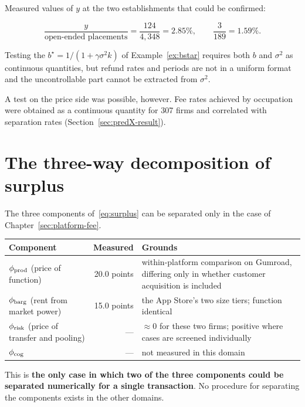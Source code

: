 Measured values of $y$ at the two establishments that could be confirmed:

\[
\frac{y}{\text{open-ended placements}} = \frac{124}{4{,}348} = 2.85\%, \qquad
\frac{3}{189} = 1.59\% .
\]

Testing the $b^\star=1/(1+\gamma\sigma^2 k)$ of Example~\ref{ex:bstar} requires both $b$ and
$\sigma^2$ as continuous quantities, but refund rates and periods are not in a uniform format
and the uncontrollable part cannot be extracted from $\sigma^2$.

A test on the price side was possible, however. Fee rates achieved by occupation were
obtained as a continuous quantity for 307 firms and correlated with separation rates
(Section~\ref{sec:predX-result}).

\section{The three-way decomposition of surplus}

The three components of~\eqref{eq:surplus} can be separated only in the case of
Chapter~\ref{sec:platform-fee}.

\begin{center}
\begin{tabularx}{\textwidth}{@{}lrX@{}}
\toprule
Component & Measured & Grounds \\
\midrule
$\phi_{\rm prod}$ (price of function) & 20.0 points & within-platform comparison on Gumroad, differing only in whether customer acquisition is included \\
$\phi_{\rm barg}$ (rent from market power) & 15.0 points & the App Store's two size tiers; function identical \\
$\phi_{\rm risk}$ (price of transfer and pooling) & --- & $\approx 0$ for these two firms; positive where cases are screened individually \\
$\phi_{\rm cog}$ & --- & not measured in this domain \\
\bottomrule
\end{tabularx}
\label{tab:surplus-decomposition-measured}
\end{center}

This is \textbf{the only case in which two of the three components could be separated
numerically for a single transaction}. No procedure for separating the components exists in
the other domains.

